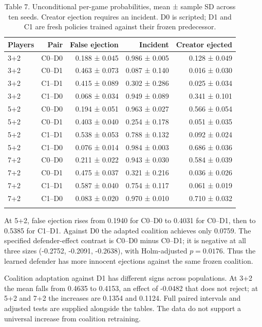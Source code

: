 \documentclass[
  12pt,
]{article}
\begin{document}
\begin{table}[htbp]
\centering
\caption{Table 7. Unconditional per-game probabilities, mean ± sample SD across
ten seeds. Creator ejection requires an incident. D0 is scripted; D1 and
C1 are fresh policies trained against their frozen predecessor.}\label{tab:7}
\begin{tabular}{@{}lrrrr@{}}
\toprule\noalign{}
Players & Pair & False ejection & Incident & Creator ejected \\
\midrule\noalign{}

3+2 & C0--D0 & 0.188 ± 0.045 & 0.986 ± 0.005 & 0.128 ± 0.049 \\
3+2 & C0--D1 & 0.463 ± 0.073 & 0.087 ± 0.140 & 0.016 ± 0.030 \\
3+2 & C1--D1 & 0.415 ± 0.089 & 0.302 ± 0.286 & 0.025 ± 0.034 \\
3+2 & C1--D0 & 0.068 ± 0.034 & 0.949 ± 0.089 & 0.341 ± 0.101 \\
5+2 & C0--D0 & 0.194 ± 0.051 & 0.963 ± 0.027 & 0.566 ± 0.054 \\
5+2 & C0--D1 & 0.403 ± 0.040 & 0.254 ± 0.178 & 0.051 ± 0.035 \\
5+2 & C1--D1 & 0.538 ± 0.053 & 0.788 ± 0.132 & 0.092 ± 0.024 \\
5+2 & C1--D0 & 0.076 ± 0.014 & 0.984 ± 0.003 & 0.686 ± 0.036 \\
7+2 & C0--D0 & 0.211 ± 0.022 & 0.943 ± 0.030 & 0.584 ± 0.039 \\
7+2 & C0--D1 & 0.475 ± 0.037 & 0.321 ± 0.216 & 0.036 ± 0.026 \\
7+2 & C1--D1 & 0.587 ± 0.040 & 0.754 ± 0.117 & 0.061 ± 0.019 \\
7+2 & C1--D0 & 0.083 ± 0.020 & 0.970 ± 0.010 & 0.710 ± 0.032 \\
\bottomrule\noalign{}
\end{tabular}
\end{table}

At 5+2, false ejection rises from 0.1940 for C0--D0 to 0.4031 for
C0--D1, then to 0.5385 for C1--D1. Against D0 the adapted coalition
achieves only 0.0759. The specified defender-effect contrast is C0--D0
minus C0--D1; it is negative at all three sizes (-0.2752, -0.2091,
-0.2638), with Holm-adjusted \(p=0.0176\). Thus the learned defender has
more innocent ejections against the same frozen coalition.

Coalition adaptation against D1 has different signs across populations.
At 3+2 the mean falls from 0.4635 to 0.4153, an effect of -0.0482 that
does not reject; at 5+2 and 7+2 the increases are 0.1354 and 0.1124.
Full paired intervals and adjusted tests are supplied alongside the
tables. The data do not support a universal increase from coalition
retraining.
\end{document}

